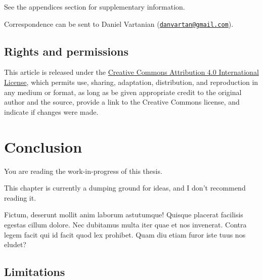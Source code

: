 \documentclass[
12pt,
openright,
oneside,
a4paper,
chapter=TITLE,
section=TITLE,
french,
spanish,
brazil,
english
]{abntex2}\usepackage{array}
\newcommand{\microskip}{\vspace{\microskipamount}}
\begin{document}
See the appendices section for supplementary information.

Correspondence can be sent to Daniel Vartanian
(\href{mailto:danvartan@gmail.com}{\nolinkurl{danvartan@gmail.com}}).

\section{Rights and permissions}\label{rights-and-permissions}

This article is released under the
\href{http://creativecommons.org/licenses/by/4.0/}{Creative Commons
Attribution 4.0 International License}, which permits use, sharing,
adaptation, distribution, and reproduction in any medium or format, as
long as be given appropriate credit to the original author and the
source, provide a link to the Creative Commons license, and indicate if
changes were made.


\chapter{Conclusion}\label{conclusion}

\begin{tcolorbox}[enhanced jigsaw, colframe=quarto-callout-important-color-frame, rightrule=.15mm, opacitybacktitle=0.6, toprule=.15mm, opacityback=0, toptitle=1mm, bottomtitle=1mm, breakable, leftrule=.75mm, title=\textcolor{quarto-callout-important-color}{\faExclamation}\hspace{0.5em}{Important}, coltitle=black, bottomrule=.15mm, arc=.35mm, titlerule=0mm, left=2mm, colback=white, colbacktitle=quarto-callout-important-color!10!white]

You are reading the work-in-progress of this thesis.

\microskip

This chapter is currently a dumping ground for ideas, and I don't
recommend reading it.

\end{tcolorbox}

Fictum, deserunt mollit anim laborum astutumque! Quisque placerat
facilisis egestas cillum dolore. Nec dubitamus multa iter quae et nos
invenerat. Contra legem facit qui id facit quod lex prohibet. Quam diu
etiam furor iste tuus nos eludet?

\section{Limitations}\label{limitations}
\end{document}

